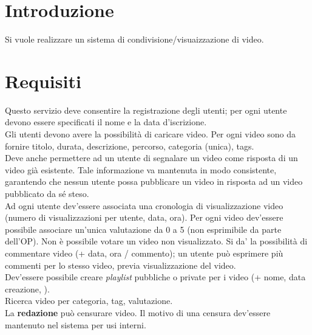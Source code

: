 \section{Introduzione}
Si vuole realizzare un sistema di condivisione/visuaizzazione di video.

\section{Requisiti}
Questo servizio deve consentire la registrazione degli utenti; per ogni utente devono essere specificati il nome e la data d'iscrizione.\\
Gli utenti devono avere la possibilità di caricare video. Per ogni video sono da fornire titolo, durata, descrizione, percorso, categoria (unica), tags.\\
Deve anche permettere ad un utente di segnalare un video come risposta di un video già esistente. Tale informazione va mantenuta in modo consistente, garantendo che nessun utente possa pubblicare un video in risposta ad un video pubblicato da sé steso. \\
Ad ogni utente dev'essere associata una cronologia di visualizzazione video (numero di visualizzazioni per utente, data, ora). Per ogni video dev'essere possibile associare un'unica valutazione da 0 a 5 (non esprimibile da parte dell'OP). Non è possibile votare un video non visualizzato. Si da' la possibilità di commentare video (+ data, ora / commento); un utente può esprimere più commenti per lo stesso video, previa visualizzazione del video. \\
Dev'essere possibile creare \textit{playlist} pubbliche o private per i video (+ nome, data creazione, ). \\
Ricerca video per categoria, tag, valutazione.\\
La \textbf{redazione} può censurare video. Il motivo di una censura dev'essere mantenuto nel sistema per usi interni.
\newpage

